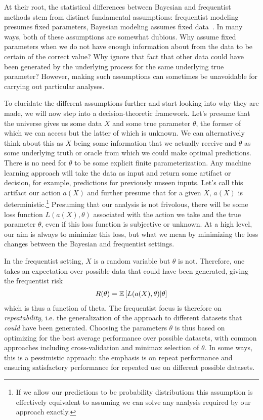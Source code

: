 At their root, the statistical differences between Bayesian and frequentist methods stem from 
distinct fundamental
assumptions: frequentist modeling presumes fixed parameters, Bayesian modeling assumes fixed data~\citep{jordan2009you}.  In many ways,
both of these assumptions are somewhat dubious. Why assume fixed parameters when we do not have enough
information about from the data to be certain of the correct value?  Why ignore that fact that other data could have 
been generated by the underlying process for the same underlying true parameter?  However,
making such assumptions can sometimes be unavoidable for carrying out particular analyses.

To elucidate the
different assumptions further and start looking into why they are made, we will now step into a decision-theoretic
framework.  Let's presume that the universe gives us some data $X$ and some true parameter $\theta$, the former of which
we can access but the latter of which is unknown.  We can alternatively think about this as $X$ being some information
that we actually receive and $\theta$ as some underlying truth or oracle from which we could make optimal predictions.  There is
no need for $\theta$ to be some explicit finite parameterization.  Any machine learning approach will take the data as input and
return some artifact or decision, for example, predictions for previously unseen inputs.  
Let's call this artifact our action $a(X)$
and further presume that for a given $X$, $a(X)$ is deterministic.\footnote{If we allow our predictions to be probability
distributions this assumption is effectively equivalent to assuming we can solve any analysis required by our approach exactly.}
Presuming that our analysis is not frivolous, there will be some loss function $L(a(X),\theta)$ associated with the action we take
and the true parameter $\theta$, even if this loss function is subjective or unknown.  At a high level, our aim is always to
minimize this loss, but what we mean by minimizing the loss changes between the Bayesian and frequentist settings.  

In the
frequentist setting, $X$ is a random variable but $\theta$ is not.  Therefore, one takes an expectation over possible data
that could have been generated, giving the frequentist risk~\cite{vapnik1998statistical}
\begin{align}
\label{eq:bayes:freq-risk}
R(\theta)  = \mathbb{E}\left[L(a(X),\theta) | \theta \right]
\end{align}
which is thus a function of theta.
The frequentist focus is therefore on \emph{repeatability}, i.e.
the generalization of the approach to different datasets that \emph{could} have been generated.
Choosing the parameters $\theta$ is thus based on optimizing for the best average performance over possible datasets,
with common approaches including cross-validation and minimax selection of $\theta$.  In some ways, this is a pessimistic
approach: the emphasis is on repeat performance and ensuring satisfactory performance for repeated use on different possible
datasets.  

